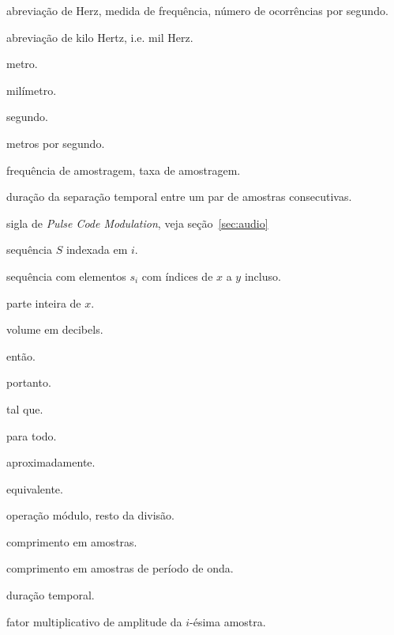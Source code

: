 	\begin{listaespecial2}[BIGNAMEWIDTH]
        \item[$Hz$] abreviação de Herz, medida de frequência, número de ocorrências por segundo.
        \item[$kHz$] abreviação de kilo Hertz, i.e. mil Herz.
        \item[$m$] metro.
        \item[$mm$] milímetro.
        \item[$s$] segundo.
        \item[$m/s$] metros por segundo.
        \item[$f_a$] frequência de amostragem, taxa de amostragem.
        \item[$\lambda_a$] duração da separação temporal entre um par de amostras consecutivas.
        \item[PCM] sigla de \emph{Pulse Code Modulation}, veja seção~\ref{sec:audio}
        \item[$S_i$] sequência $S$ indexada em $i$.
        \item[$\{s_i\}_x^{y}$] sequência com elementos $s_i$ com índices de $x$ a $y$ incluso.
        \item[$\lfloor x \rfloor$] parte inteira de $x$.
        \item[$V_{dB}$] volume em decibels.
        \item[$\Rightarrow$] então.
        \item[$\therefore$] portanto.
        \item[$:$] tal que.
        \item[$\forall$] para todo.
        \item[$\approx$] aproximadamente.
        \item[$\equiv$] equivalente.
        \item[$\%$] operação módulo, resto da divisão.
        \item[$\Lambda$] comprimento em amostras.
        \item[$\widetilde{\Lambda}$] comprimento em amostras de período de onda.
        \item[$\Delta$] duração temporal.
        \item[$a_i$] fator multiplicativo de amplitude da $i$-ésima amostra.
	\end{listaespecial2} 


